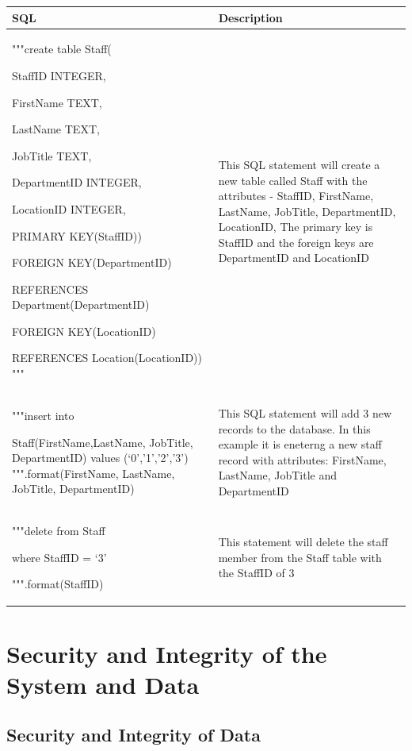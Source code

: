\begin{center}
\begin{tabular}{|p{6cm}|p{5cm}|}
\hline
\textbf{SQL}      & \textbf{Description} \\ \hline
"""create table Staff(\

   StaffID INTEGER,\

   FirstName TEXT,\

   LastName TEXT,\

   JobTitle TEXT,\

   DepartmentID INTEGER,\

   LocationID INTEGER,\

   PRIMARY KEY(StaffID))\

   FOREIGN KEY(DepartmentID) \

   REFERENCES Department(DepartmentID)\

   FOREIGN KEY(LocationID) \

   REFERENCES Location(LocationID)) """                         & This SQL statement will create a new table called Staff with the attributes - StaffID, FirstName, LastName, JobTitle, DepartmentID, LocationID, The primary key is StaffID and the foreign keys are DepartmentID and LocationID                       \\ \hline

"""insert into\

Staff(FirstName,LastName, JobTitle, DepartmentID) values
(‘{0}’,’{1}’,’{2}’,'{3}')
""".format(FirstName, LastName, JobTitle, DepartmentID) & This SQL statement will add 3 new records to the database. In this example it is eneterng a new staff record with attributes: FirstName, LastName, JobTitle and DepartmentID \\ \hline

"""delete from Staff\

where StaffID = ‘{3}’\

""".format(StaffID) & This statement will delete the staff member from the Staff table with the StaffID of {3} \\ \hline

\end{tabular}
\end{center}

\section{Security and Integrity of the System and Data}

\subsection{Security and Integrity of Data}

